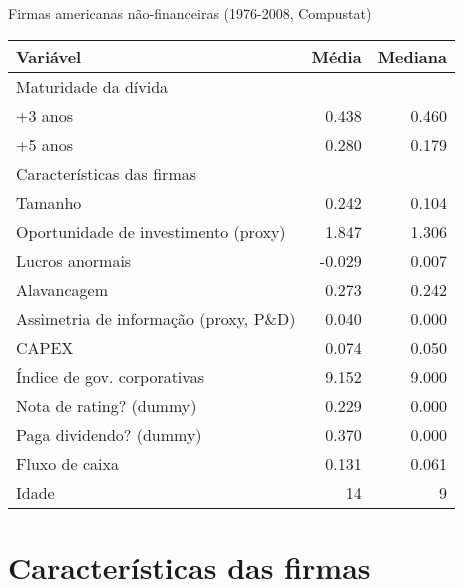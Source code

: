 \documentclass[presentation]{beamer}
\begin{document}
\begin{frame}[label={sec:org76b2d09}]{Firmas americanas não-financeiras (1976-2008, Compustat)}
\begin{center}
\begin{tabular}{lrr}
\hline
Variável & Média & Mediana\\
\hline
Maturidade da dívida &  & \\
\hline
+3 anos & 0.438 & 0.460\\
+5 anos & 0.280 & 0.179\\
\hline
Características das firmas &  & \\
\hline
Tamanho & 0.242 & 0.104\\
Oportunidade de investimento (proxy) & 1.847 & 1.306\\
Lucros anormais & -0.029 & 0.007\\
Alavancagem & 0.273 & 0.242\\
Assimetria de informação (proxy, P\&D) & 0.040 & 0.000\\
CAPEX & 0.074 & 0.050\\
Índice de gov. corporativas & 9.152 & 9.000\\
Nota de rating? (dummy) & 0.229 & 0.000\\
Paga dividendo? (dummy) & 0.370 & 0.000\\
Fluxo de caixa & 0.131 & 0.061\\
Idade & 14 & 9\\
\hline
\end{tabular}
\end{center}
\end{frame}

\section{Características das firmas}
\label{sec:org77ecc85}
\end{document}
